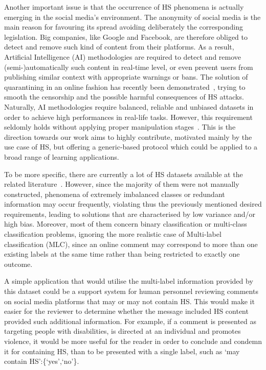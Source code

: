 \documentclass[sigconf]{acmart}
\begin{document}
Another important issue is that the occurrence of HS phenomena is actually emerging in the social media's environment. The anonymity of social media is the main reason for favouring its spread avoiding deliberately the corresponding legislation. Big companies, like Google and Facebook, are therefore obliged to detect and remove such kind of content from their platforms. As a result, Artificial Intelligence (AI) methodologies are required to detect and remove (semi-)automatically such content in real-time level, or even prevent users from publishing similar context with appropriate warnings or bans. The solution of quarantining in an online fashion has recently been demonstrated~\cite{DBLP:journals/ethicsit/UllmannT20}, trying to smooth the censorship and the possible harmful consequences of HS attacks. Naturally, AI methodologies require balanced, reliable and unbiased datasets in order to achieve high performances in real-life tasks. However, this requirement seldomly holds without applying proper manipulation stages~\cite{DBLP:conf/cikm/ChenMLZM19}. This is the direction towards our work aims to highly contribute, motivated mainly by the use case of HS, but offering a generic-based protocol which could be applied to a broad range of learning applications.

To be more specific, there are currently a lot of HS datasets available at the related literature~\cite{waseem-hovy, DBLP:conf/naacl/ZampieriMNRFK19}. However, since the majority of them were not manually constructed, phenomena of extremely imbalanced classes or redundant information may occur frequently, violating thus the previously mentioned desired requirements, leading to solutions that are characterised by low variance and/or high bias. Moreover, most of them concern binary classification or multi-class classification problems, ignoring the more realistic case of Multi-label classification (MLC), since an online comment may correspond to more than one existing labels at the same time rather than being restricted to exactly one outcome. 

A simple application that would utilise the multi-label information provided by this dataset could be a support system for human personnel reviewing comments on social media platforms that may or may not contain HS. This would make it easier for the reviewer to determine whether the message included HS content provided such additional information. For example, if a comment is presented as targeting people with disabilities, is directed at an individual and promotes violence, it would be more useful for the reader in order to conclude and condemn it for containing HS, than to be presented with a single label, such as `may contain HS':\{`yes',`no'\}.
\end{document}
